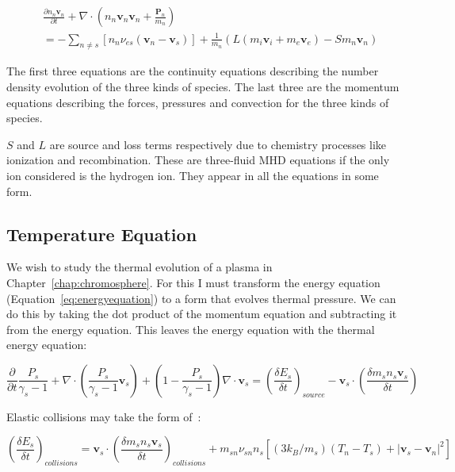 \documentclass[12pt,upcase]{umlthesis}
\begin{document}
\begin{equation}\label{eq:nmomentum}
	\begin{aligned}
	& \frac{\partial n_n \textbf{v}_n}{\partial t} + \nabla \cdot (n_n \textbf{v}_n \textbf{v}_n + \frac{\textbf{P}_n}{m_n} ) \\
	& = - \sum_{n \neq s} [n_n \nu_{es}(\textbf{v}_n - \textbf{v}_s)] + \frac{1}{m_n} (L(m_i\textbf{v}_i+m_e\textbf{v}_e) -S m_n \textbf{v}_n)
\end{aligned}
\end{equation}

The first three equations are the continuity equations describing the number density evolution of the three kinds of species. The last three are the momentum equations describing the forces, pressures and convection for the three kinds of species.

$S$ and $L$ are source and loss terms respectively due to chemistry processes like ionization and recombination. These are three-fluid MHD equations if the only ion considered is the hydrogen ion. They appear in all the equations in some form.

\subsection{Temperature Equation}

We wish to study the thermal evolution of a plasma in Chapter~\ref{chap:chromosphere}. For this I must transform the energy equation (Equation~\ref{eq:energyequation}) to a form that evolves thermal pressure. We can do this by taking the dot product of the momentum equation and subtracting it from the energy equation. This leaves the energy equation with the thermal energy equation:

\begin{equation}\label{eq:pressureequation}
	\frac{\partial }{\partial t}\frac{P_s}{\gamma_s - 1} +\nabla\cdot(\frac{P_s}{\gamma_s -1}\textbf{v}_s) + (1 - \frac{P_s}{\gamma_s - 1}) \nabla\cdot\textbf{v}_s = {(\frac{\delta E_s}{\delta t})}_{source} - \textbf{v}_s \cdot(\frac{\delta m_s n_s\textbf{v}_s}{\delta t})
\end{equation}

Elastic collisions may take the form of~\citep{Banks1973}:

\begin{equation}\label{eq:energycollisions}
	{(\frac{\delta E_s}{\delta t})}_{collisions} = \textbf{v}_s \cdot {(\frac{\delta m_s n_s \textbf{v}_s}{\delta t})}_{collisions} + m_{sn} \nu_{sn} n_s [ (3 k_B / m_s) (T_n - T_s) + \lvert \textbf{v}_s - \textbf{v}_n \rvert^2 ]
\end{equation}
\end{document}
